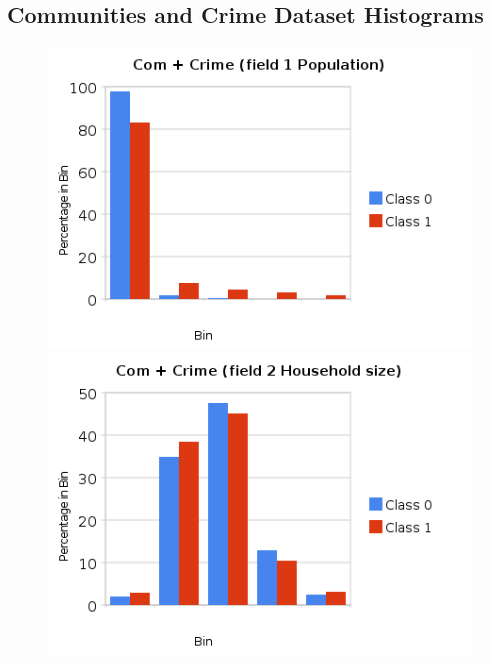 \documentclass[a4paper,10pt]{article}
\begin{document}
        \subsection{Communities and Crime Dataset Histograms}

        \begin{figure}[ht!]
          \begin{minipage}[b]{0.5\linewidth}
            \includegraphics[scale=0.45]{charts/ComCrimePics/CC1.png}
          \end{minipage}
          \begin{minipage}[b]{0.5\linewidth}
             \includegraphics[scale=0.45]{charts/ComCrimePics/CC2.png}
          \end{minipage}
        \end{figure}
\end{document}
